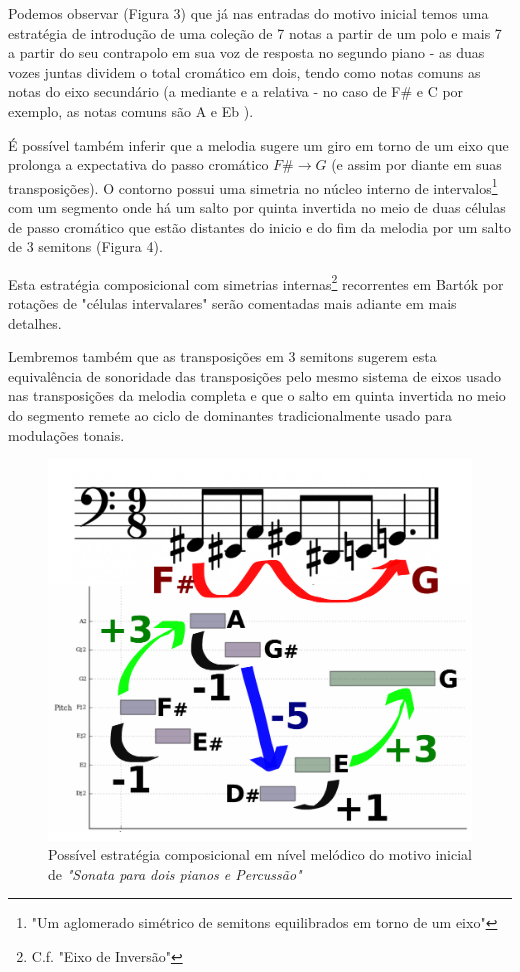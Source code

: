 \documentclass[
	12pt,				%
	openright,			%
	twoside,			%
	a4paper,			%
	english,			%
	french,				%
	spanish,			%
	brazil				%
	]{abntex2}
\begin{document}
Podemos observar (Figura 3) que já nas entradas do motivo inicial temos uma estratégia de introdução de uma coleção de 7 notas a partir de um polo e mais 7 a partir do seu contrapolo em sua voz de resposta no segundo piano - as duas vozes juntas dividem o total cromático em dois, tendo como notas comuns as notas do eixo secundário (a mediante e a relativa - no caso de F\# e C por exemplo, as notas comuns são A e Eb ).

É possível também inferir que a melodia sugere um giro em torno de um eixo que prolonga a expectativa do passo cromático $F\# \rightarrow G$ (e assim por diante em suas transposições). O contorno possui uma simetria no núcleo interno de intervalos\footnote{"Um aglomerado simétrico de semitons equilibrados em torno de um eixo"\cite[ p.120]{straus2004}} com um segmento onde há um salto por quinta invertida no meio de duas células de passo cromático que estão distantes do inicio e do fim da melodia por um salto de 3 semitons (Figura 4). 

Esta estratégia composicional com simetrias internas\footnote{C.f. "Eixo de Inversão"\cite[ p.121]{straus2004}} recorrentes em Bartók por rotações de "células intervalares"\cite[ p.128]{susanni_antokoletz2012music} serão comentadas mais adiante em mais detalhes. 

Lembremos também que as transposições em 3 semitons sugerem esta equivalência de sonoridade das transposições pelo mesmo sistema de eixos usado nas transposições da melodia completa e que o salto em quinta invertida no meio do segmento remete ao ciclo de dominantes tradicionalmente usado para modulações tonais.


\begin{figure}[!h]
	\caption{\label{fig_grafico}Possível estratégia composicional em nível melódico do motivo inicial de \textit{"Sonata para dois pianos e Percussão"}}
	\begin{center}
	    \includegraphics[scale=0.4]{axis/temasonata2P.pdf}
	\end{center}
\end{figure}
\end{document}
